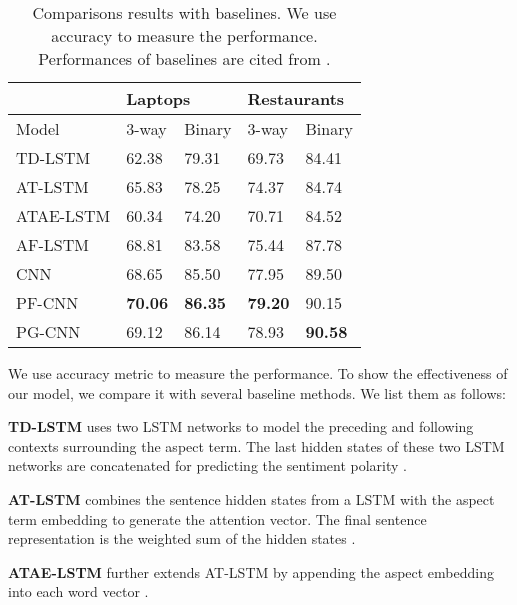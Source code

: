 \documentclass[11pt,a4paper]{article}
\begin{document}
\begin{table}[]
\centering
\begin{tabular}{|l|l|l|l|l|}
\hline
          & \multicolumn{2}{l|}{Laptops} & \multicolumn{2}{l|}{Restaurants} \\ \hline
Model     & 3-way        & Binary        & 3-way          & Binary          \\ \hline
TD-LSTM   & 62.38        & 79.31         & 69.73          & 84.41           \\ \hline
AT-LSTM   & 65.83        & 78.25         & 74.37          & 84.74           \\ \hline
ATAE-LSTM & 60.34        & 74.20         & 70.71          & 84.52           \\ \hline
AF-LSTM   & 68.81        & 83.58         & 75.44          & 87.78           \\ \hline 
CNN & 68.65        & 85.50         & 77.95          & 89.50          \\ \hline 
PF-CNN     & \textbf{70.06}            &    \textbf{86.35}           &               \textbf{79.20} &   {90.15}              \\ \hline
PG-CNN     & {69.12}            &    {86.14}           &               {78.93} &   \textbf{90.58}              \\ \hline
\end{tabular}
\caption{Comparisons results with baselines. We use accuracy to measure the performance. Performances of baselines are cited from \cite{tay2017learning}.}
\vspace{-0.4cm}
\label{compare}
\end{table}
We use accuracy metric to measure the performance. To show the effectiveness of our model, we compare it with several baseline methods. We list them as follows:



\textbf{TD-LSTM} uses two LSTM networks to model the preceding and following contexts surrounding the aspect term. The last hidden states of these two LSTM networks are concatenated for predicting the sentiment polarity \cite{tang2015effective}.

\textbf{AT-LSTM} combines the sentence hidden states from a LSTM with the aspect term embedding to generate the attention vector. The final sentence representation is the weighted sum of the hidden states \cite{wang2016attention}.

\textbf{ATAE-LSTM} further extends AT-LSTM by appending the aspect embedding into each word vector \cite{wang2016attention}.
\end{document}

